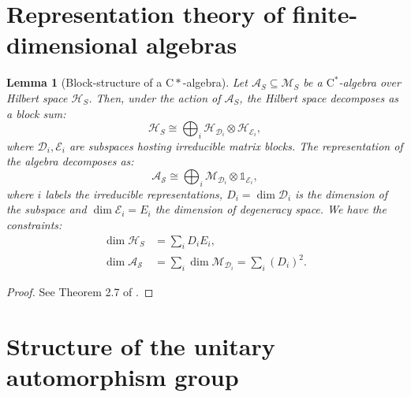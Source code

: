 \documentclass[11pt, twocolumn, floatfix, superscriptaddress, aps, prb, raggedbottom]{revtex4-2}
\newtheorem{lemma}[theorem]{Lemma}
\newcommand{\cstar}{$\mathrm{C}^*$-algebra }
\begin{document}
\section{Representation theory of finite-dimensional algebras \label{app:rep_theory}}
\begin{lemma}[Block-structure of a $\mathrm{C}*$-algebra]
    Let $\mathcal{A}_S\subseteq \mathcal{M}_S$ be a \cstar over Hilbert space $\mathcal{H}_S$. Then, under the action of $\mathcal{A}_S$, the Hilbert space decomposes as a block sum: 
    \begin{equation}
        \mathcal{H}_S\cong \bigoplus_i \mathcal{H}_{\mathcal{D}_i} \otimes \mathcal{H}_{\mathcal{E}_i},
    \end{equation}
    \noindent where $\mathcal{D}_i, \mathcal{E}_i$ are subspaces hosting irreducible matrix blocks. The representation of the algebra decomposes as:
    \begin{equation}
        \mathcal{\mathcal{A}_S} \cong \bigoplus_i \mathcal{M}_{\mathcal{D}_i} \otimes \mathds{1}_{\mathcal{E}_i},
    \end{equation}
    \noindent where $i$ labels the irreducible representations, $D_i = \dim \mathcal{D}_i$ is the dimension of the subspace and $ \dim \mathcal{E}_i = E_i$ the dimension of degeneracy space. We have the constraints:
    \begin{align}
         \dim \mathcal{H}_S&= \sum_i D_i E_i, \\
         \dim \mathcal{A_S}&= \sum_i\dim  \mathcal{M}_{\mathcal{D}_i} = \sum_i ( D_i)^2 .
    \end{align}
    
\end{lemma}
\begin{proof}
    See Theorem 2.7 of \cite{Bény2020}.
\end{proof}

\section{Structure of the unitary automorphism group \label{app:normaliser}}
\end{document}
